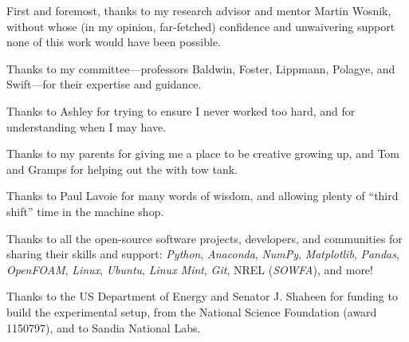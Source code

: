 



\begin{Acknowledgments}
\setlength{\baselineskip}{1.5\baselineskip}
{

    First and foremost, thanks to my research advisor and mentor Martin Wosnik,
    without whose (in my opinion, far-fetched) confidence and unwaivering
    support none of this work would have been possible.

    Thanks to my committee---professors Baldwin, Foster, Lippmann, Polagye, and
    Swift---for their expertise and guidance.

    Thanks to Ashley for trying to ensure I never worked too hard, and for
    understanding when I may have.

    Thanks to my parents for giving me a place to be creative growing up, and
    Tom and Gramps for helping out the with tow tank.

    Thanks to Paul Lavoie for many words of wisdom, and allowing plenty of
    ``third shift'' time in the machine shop.

    Thanks to all the open-source software projects, developers, and communities
    for sharing their skills and support: \textit{Python}, \textit{Anaconda},
    \textit{NumPy}, \textit{Matplotlib}, \textit{Pandas}, \textit{OpenFOAM},
    \textit{Linux}, \textit{Ubuntu}, \textit{Linux Mint}, \textit{Git}, NREL
    (\textit{SOWFA}), and more!

    Thanks to the US Department of Energy and Senator J. Shaheen for funding to
    build the experimental setup, from the National Science Foundation (award
    1150797), and to Sandia National Labs.


}
\end{Acknowledgments}
